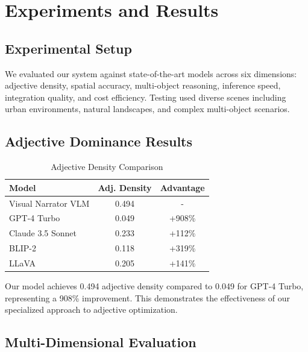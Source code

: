 \documentclass[10pt]{article}
\begin{document}
\section{Experiments and Results}

\subsection{Experimental Setup}
We evaluated our system against state-of-the-art models across six dimensions: adjective density, spatial accuracy, multi-object reasoning, inference speed, integration quality, and cost efficiency. Testing used diverse scenes including urban environments, natural landscapes, and complex multi-object scenarios.

\subsection{Adjective Dominance Results}

\begin{table}[h]
\centering
\caption{Adjective Density Comparison}
\label{tab:adjective}
\begin{tabular}{lcc}
\toprule
\textbf{Model} & \textbf{Adj. Density} & \textbf{Advantage} \\
\midrule
Visual Narrator VLM & 0.494 & - \\
GPT-4 Turbo & 0.049 & +908\% \\
Claude 3.5 Sonnet & 0.233 & +112\% \\
BLIP-2 & 0.118 & +319\% \\
LLaVA & 0.205 & +141\% \\
\bottomrule
\end{tabular}
\end{table}

Our model achieves 0.494 adjective density compared to 0.049 for GPT-4 Turbo, representing a 908\% improvement. This demonstrates the effectiveness of our specialized approach to adjective optimization.

\subsection{Multi-Dimensional Evaluation}
\end{document}
